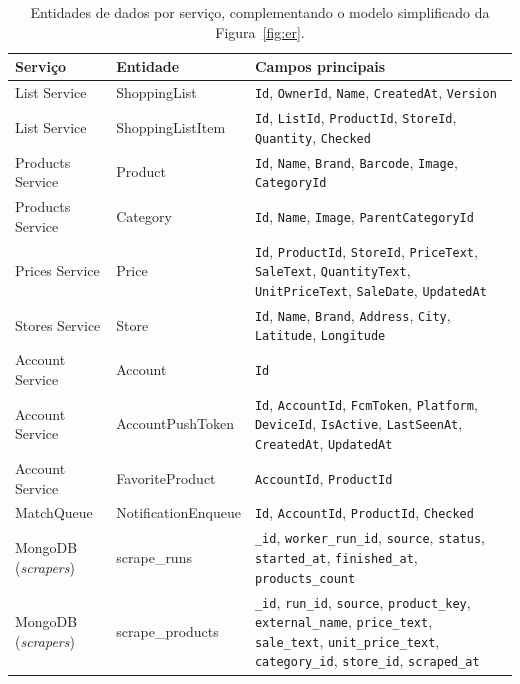 \begin{table}[H]
\centering
\caption{Entidades de dados por serviço, complementando o modelo simplificado da Figura~\ref{fig:er}.}
\label{tab:entidades}
\footnotesize
\renewcommand{\arraystretch}{1.15}
\begin{tabular}{|>{\raggedright\arraybackslash}p{2.4cm}|>{\raggedright\arraybackslash}p{2.7cm}|p{8.0cm}|}
\hline
\textbf{Serviço} & \textbf{Entidade} & \textbf{Campos principais} \\
\hline
List Service & ShoppingList & \texttt{Id}, \texttt{OwnerId}, \texttt{Name}, \texttt{CreatedAt}, \texttt{Version} \\
\hline
List Service & ShoppingListItem & \texttt{Id}, \texttt{ListId}, \texttt{ProductId}, \texttt{StoreId}, \texttt{Quantity}, \texttt{Checked} \\
\hline
Products Service & Product & \texttt{Id}, \texttt{Name}, \texttt{Brand}, \texttt{Barcode}, \texttt{Image}, \texttt{CategoryId} \\
\hline
Products Service & Category & \texttt{Id}, \texttt{Name}, \texttt{Image}, \texttt{ParentCategoryId} \\
\hline
Prices Service & Price & \texttt{Id}, \texttt{ProductId}, \texttt{StoreId}, \texttt{PriceText}, \texttt{SaleText}, \texttt{QuantityText}, \texttt{UnitPriceText}, \texttt{SaleDate}, \texttt{UpdatedAt} \\
\hline
Stores Service & Store & \texttt{Id}, \texttt{Name}, \texttt{Brand}, \texttt{Address}, \texttt{City}, \texttt{Latitude}, \texttt{Longitude} \\
\hline
Account Service & Account & \texttt{Id} \\
\hline
Account Service & AccountPushToken & \texttt{Id}, \texttt{AccountId}, \texttt{FcmToken}, \texttt{Platform}, \texttt{DeviceId}, \texttt{IsActive}, \texttt{LastSeenAt}, \texttt{CreatedAt}, \texttt{UpdatedAt} \\
\hline
Account Service & FavoriteProduct & \texttt{AccountId}, \texttt{ProductId} \\
\hline
MatchQueue & NotificationEnqueue & \texttt{Id}, \texttt{AccountId}, \texttt{ProductId}, \texttt{Checked} \\
\hline
MongoDB (\textit{scrapers}) & scrape\_runs & \texttt{\_id}, \texttt{worker\_run\_id}, \texttt{source}, \texttt{status}, \texttt{started\_at}, \texttt{finished\_at}, \texttt{products\_count} \\
\hline
MongoDB (\textit{scrapers}) & scrape\_products & \texttt{\_id}, \texttt{run\_id}, \texttt{source}, \texttt{product\_key}, \texttt{external\_name}, \texttt{price\_text}, \texttt{sale\_text}, \texttt{unit\_price\_text}, \texttt{category\_id}, \texttt{store\_id}, \texttt{scraped\_at} \\
\hline
\end{tabular}
\end{table}

